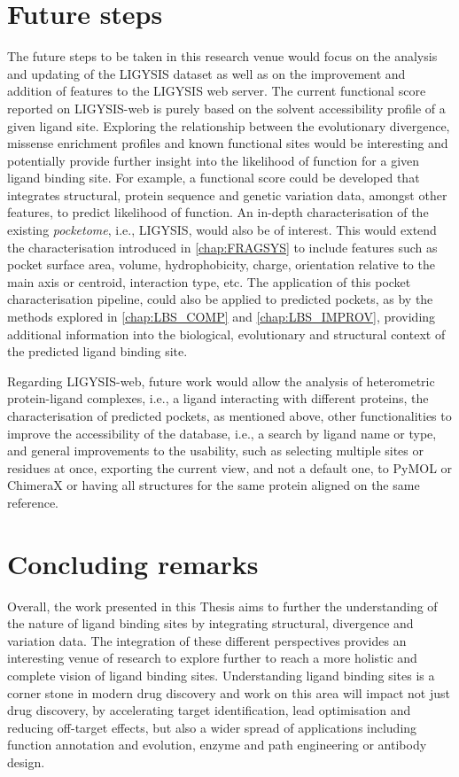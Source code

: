 \section{Future steps}

The future steps to be taken in this research venue would focus on the analysis and updating of the LIGYSIS dataset as well as on the improvement and addition of features to the LIGYSIS web server. The current functional score reported on LIGYSIS-web is purely based on the solvent accessibility profile of a given ligand site. Exploring the relationship between the evolutionary divergence, missense enrichment profiles and known functional sites would be interesting and potentially provide further insight into the likelihood of function for a given ligand binding site. For example, a functional score could be developed that integrates structural, protein sequence and genetic variation data, amongst other features, to predict likelihood of function. An in-depth characterisation of the existing \textit{pocketome}, i.e., LIGYSIS, would also be of interest. This would extend the characterisation introduced in \autoref{chap:FRAGSYS} to include features such as pocket surface area, volume, hydrophobicity, charge, orientation relative to the main axis or centroid, interaction type, etc. The application of this pocket characterisation pipeline, could also be applied to predicted pockets, as by the methods explored in \autoref{chap:LBS_COMP} and \autoref{chap:LBS_IMPROV}, providing additional information into the biological, evolutionary and structural context of the predicted ligand binding site.

Regarding LIGYSIS-web, future work would allow the analysis of heterometric protein-ligand complexes, i.e., a ligand interacting with different proteins, the characterisation of predicted pockets, as mentioned above, other functionalities to improve the accessibility of the database, i.e., a search by ligand name or type, and general improvements to the usability, such as selecting multiple sites or residues at once, exporting the current view, and not a default one, to PyMOL \cite{SCHRODINGER_2015_PYMOL} or ChimeraX \cite{PETTERSEN_2021_CHIMERAX} or having all structures for the same protein aligned on the same reference.

\section{Concluding remarks}

Overall, the work presented in this Thesis aims to further the understanding of the nature of ligand binding sites by integrating structural, divergence and variation data. The integration of these different perspectives provides an interesting venue of research to explore further to reach a more holistic and complete vision of ligand binding sites. Understanding ligand binding sites is a corner stone in modern drug discovery and work on this area will impact not just drug discovery, by accelerating target identification, lead optimisation and reducing off-target effects, but also a wider spread of applications including function annotation and evolution, enzyme and path engineering or antibody design.